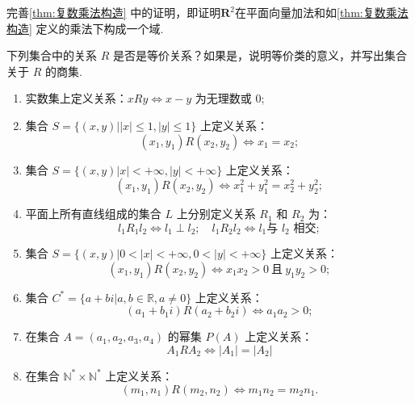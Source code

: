 \begin{exercise}

    \begin{exgroup}
        \item 完善\autoref{thm:复数乘法构造} 中的证明，即证明$\mathbf{R}^2$在平面向量加法和如\autoref*{thm:复数乘法构造} 定义的乘法下构成一个域.

        \item 下列集合中的关系 \( R \) 是否是等价关系？如果是，说明等价类的意义，并写出集合关于 \( R \) 的商集.
        \begin{enumerate}
            \item 实数集上定义关系：\( xRy \iff x - y \) 为无理数或 0;
            \item 集合 \( S = \{ (x, y) | |x| \leq 1, |y| \leq 1 \} \) 上定义关系：\[ (x_1, y_1) R (x_2, y_2) \iff x_1 = x_2; \]
            \item 集合 \( S = \{ (x, y) | x| < +\infty, |y| < +\infty \} \) 上定义关系：\[ (x_1, y_1) R (x_2, y_2) \iff x_1^2 + y_1^2 = x_2^2 + y_2^2; \]
            \item 平面上所有直线组成的集合 \( L \) 上分别定义关系 \( R_1 \) 和 \( R_2 \) 为：\[ l_1 R_1 l_2 \iff l_1 \perp l_2; \quad l_1 R_2 l_2 \iff l_1 \text{与 $l_2$ 相交};\]
            \item 集合 \( S = \{ (x, y) | 0 < |x| < +\infty, 0 < |y| < +\infty \} \) 上定义关系：\[ (x_1, y_1) R (x_2, y_2) \iff x_1 x_2 > 0 \ \text{且} \ y_1 y_2 > 0; \]
            \item 集合 \( C^* = \{ a + bi | a, b \in \mathbb{R}, a \neq 0 \} \) 上定义关系：\[ (a_1 + b_1 i) R (a_2 + b_2 i) \iff a_1 a_2 > 0; \]
            \item 在集合 \( A = (a_1, a_2, a_3, a_4) \) 的幂集 \( P(A) \) 上定义关系：\[ A_1 R A_2 \iff |A_1| = |A_2| \]
            \item 在集合 \( \mathbb{N}^* \times \mathbb{N}^* \) 上定义关系：\[ (m_1, n_1) R (m_2, n_2) \iff m_1 n_2 = m_2 n_1.\]
        \end{enumerate}


\end{exgroup}
\end{exercise}
